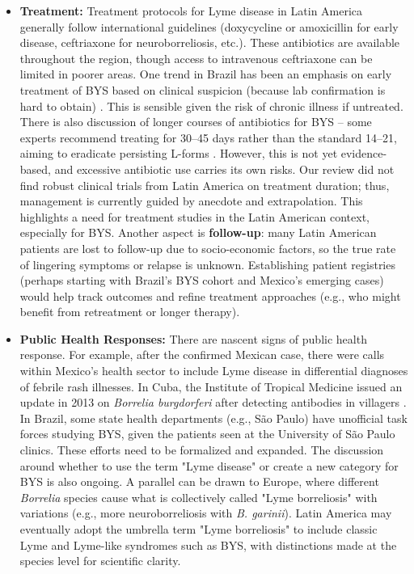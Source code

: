 \documentclass[11pt,letterpaper]{article}
\begin{document}
\begin{itemize}
    \item \textbf{Treatment:} Treatment protocols for Lyme disease in Latin America generally follow international guidelines (doxycycline or amoxicillin for early disease, ceftriaxone for neuroborreliosis, etc.). These antibiotics are available throughout the region, though access to intravenous ceftriaxone can be limited in poorer areas. One trend in Brazil has been an emphasis on early treatment of BYS based on clinical suspicion (because lab confirmation is hard to obtain) \citep{Yoshinari2022ag}. This is sensible given the risk of chronic illness if untreated. There is also discussion of longer courses of antibiotics for BYS – some experts recommend treating for 30–45 days rather than the standard 14–21, aiming to eradicate persisting L-forms \citep{Yoshinari2022ah, Yoshinari2022ai}. However, this is not yet evidence-based, and excessive antibiotic use carries its own risks. Our review did not find robust clinical trials from Latin America on treatment duration; thus, management is currently guided by anecdote and extrapolation. This highlights a need for treatment studies in the Latin American context, especially for BYS. Another aspect is \textbf{follow-up}: many Latin American patients are lost to follow-up due to socio-economic factors, so the true rate of lingering symptoms or relapse is unknown. Establishing patient registries (perhaps starting with Brazil's BYS cohort and Mexico's emerging cases) would help track outcomes and refine treatment approaches (e.g., who might benefit from retreatment or longer therapy).

    \item \textbf{Public Health Responses:} There are nascent signs of public health response. For example, after the confirmed Mexican case, there were calls within Mexico's health sector to include Lyme disease in differential diagnoses of febrile rash illnesses. In Cuba, the Institute of Tropical Medicine issued an update in 2013 on \textit{Borrelia burgdorferi} after detecting antibodies in villagers \citep{Lucca2024w}. In Brazil, some state health departments (e.g., São Paulo) have unofficial task forces studying BYS, given the patients seen at the University of São Paulo clinics. These efforts need to be formalized and expanded. The discussion around whether to use the term "Lyme disease" or create a new category for BYS is also ongoing. A parallel can be drawn to Europe, where different \textit{Borrelia} species cause what is collectively called "Lyme borreliosis" with variations (e.g., more neuroborreliosis with \textit{B. garinii}). Latin America may eventually adopt the umbrella term "Lyme borreliosis" to include classic Lyme and Lyme-like syndromes such as BYS, with distinctions made at the species level for scientific clarity.


\end{itemize}
\end{document}
